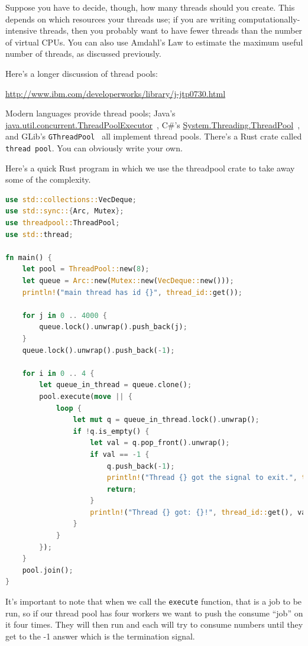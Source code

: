 \documentclass[a4paper]{report}
\begin{document}
Suppose you have to decide, though, how many threads should you create.
This depends
on which resources your threads use; if you are writing
computationally-intensive threads, then you probably want to have
fewer threads than the number of virtual CPUs. You can also use
Amdahl's Law to estimate the maximum useful number of threads, as
discussed previously.

Here's a longer discussion of thread pools:

\begin{center}
\url{http://www.ibm.com/developerworks/library/j-jtp0730.html}
\end{center}

Modern languages provide thread pools; Java's
\url{java.util.concurrent.ThreadPoolExecutor}~\cite{java:threadpoolexecutor}, C\#'s
\url{System.Threading.ThreadPool}~\cite{csharp:threadpool}, and GLib's {\tt GThreadPool}~\cite{gnome:threadpool} all implement thread pools. There's a Rust crate called \texttt{thread pool}. You can obviously write your own.

Here's a quick Rust program in which we use the threadpool crate to take away some of the complexity.
\begin{lstlisting}[language=Rust]
use std::collections::VecDeque;
use std::sync::{Arc, Mutex};
use threadpool::ThreadPool;
use std::thread;

fn main() {
    let pool = ThreadPool::new(8);
    let queue = Arc::new(Mutex::new(VecDeque::new()));
    println!("main thread has id {}", thread_id::get());

    for j in 0 .. 4000 {
        queue.lock().unwrap().push_back(j);
    }
    queue.lock().unwrap().push_back(-1);

    for i in 0 .. 4 {
        let queue_in_thread = queue.clone();
        pool.execute(move || {
            loop {
                let mut q = queue_in_thread.lock().unwrap();
                if !q.is_empty() {
                    let val = q.pop_front().unwrap();
                    if val == -1 {
                        q.push_back(-1);
                        println!("Thread {} got the signal to exit.", thread_id::get());
                        return;
                    }
                    println!("Thread {} got: {}!", thread_id::get(), val);
                }
            }
        });
    }
    pool.join();
}
\end{lstlisting}

It's important to note that when we call the \texttt{execute} function, that is a job to be run, so if our thread pool has four workers we want to push the consume ``job'' on it four times. They will then run and each will try to consume numbers until they get to the -1 answer which is the termination signal.
\end{document}
